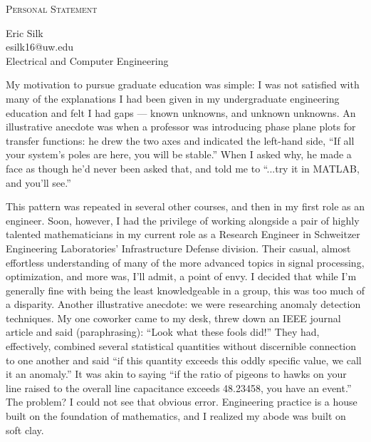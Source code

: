 \documentclass[letterpaper]{article}
\makeatletter
\newcommand{\soptitle}{Personal Statement}
\newcommand{\yourname}{Eric Silk}
\newcommand{\youremail}{esilk16@uw.edu}
\makeatother
\begin{document}
\begin{center}{\huge \scshape \soptitle}\end{center}
\begin{center}\vspace{0.2em} {\Large \yourname\\}
  {\youremail\\}{Electrical and Computer Engineering}\end{center}
\frenchspacing
My motivation to pursue graduate education was simple: I was not satisfied
with many of the explanations I had been given in my undergraduate engineering education and
felt I had gaps --- known unknowns, and unknown unknowns.
An illustrative anecdote was when a professor was introducing phase plane plots for
transfer functions: he drew the two axes and indicated the left-hand side, ``If all
your system's poles are here, you will be stable.'' When I asked why, he made a face
as though he'd never been asked that, and told me to ``...try it in MATLAB, and you'll see.''

This pattern was repeated in several other courses, and then in my first role as an engineer.
Soon, however, I had the privilege of working alongside a pair of highly talented mathematicians
in my current role as a Research  Engineer in Schweitzer Engineering Laboratories' Infrastructure Defense division.
Their casual, almost
effortless understanding of many of the more advanced topics in signal processing, optimization,
and more was, I'll admit, a point of envy. I decided that while I'm generally fine with being
the least knowledgeable in a group, this was too much of a disparity. Another illustrative
anecdote: we were researching anomaly detection techniques. My one coworker came to my desk,
threw down an IEEE journal article and said (paraphrasing): ``Look what these fools did!''
They had, effectively, combined several statistical quantities without discernible connection
to one another and said ``if this quantity exceeds this oddly specific value, we
call it an anomaly.'' It was akin to saying ``if the ratio of pigeons to hawks on your
line raised to the overall line capacitance exceeds 48.23458, you have an event.''
The problem? I could not see that obvious error. Engineering practice is a house built on the
foundation of mathematics, and I realized my abode was built on soft clay.
\end{document}
